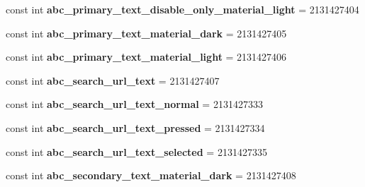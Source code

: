 \begin{DoxyCompactItemize}
const int {\bfseries abc\+\_\+primary\+\_\+text\+\_\+disable\+\_\+only\+\_\+material\+\_\+light} = 2131427404
\item 
\mbox{\label{class_pinned_app_1_1_droid_1_1_resource_1_1_color_ae5ba18bb62a6a3e86344855de4295660}} 
const int {\bfseries abc\+\_\+primary\+\_\+text\+\_\+material\+\_\+dark} = 2131427405
\item 
\mbox{\label{class_pinned_app_1_1_droid_1_1_resource_1_1_color_a1d764cc212545d125c6005e92f7e8e37}} 
const int {\bfseries abc\+\_\+primary\+\_\+text\+\_\+material\+\_\+light} = 2131427406
\item 
\mbox{\label{class_pinned_app_1_1_droid_1_1_resource_1_1_color_a3195ae8245aab81fc537a16a357931e8}} 
const int {\bfseries abc\+\_\+search\+\_\+url\+\_\+text} = 2131427407
\item 
\mbox{\label{class_pinned_app_1_1_droid_1_1_resource_1_1_color_aa5d6e8dddea93bca261afc0bc57f1861}} 
const int {\bfseries abc\+\_\+search\+\_\+url\+\_\+text\+\_\+normal} = 2131427333
\item 
\mbox{\label{class_pinned_app_1_1_droid_1_1_resource_1_1_color_a1c7e9f5952651d6d69d71a32d571486a}} 
const int {\bfseries abc\+\_\+search\+\_\+url\+\_\+text\+\_\+pressed} = 2131427334
\item 
\mbox{\label{class_pinned_app_1_1_droid_1_1_resource_1_1_color_a264a3563d13a2b5424b58ac230d1348a}} 
const int {\bfseries abc\+\_\+search\+\_\+url\+\_\+text\+\_\+selected} = 2131427335
\item 
\mbox{\label{class_pinned_app_1_1_droid_1_1_resource_1_1_color_a3e2ec318bd841a7e4081ba9da8e26cc2}} 
const int {\bfseries abc\+\_\+secondary\+\_\+text\+\_\+material\+\_\+dark} = 2131427408
\item 
\mbox{\label{class_pinned_app_1_1_droid_1_1_resource_1_1_color_ad7c97cda818c74c50aad632d893d3223}} 

\end{DoxyCompactItemize}
